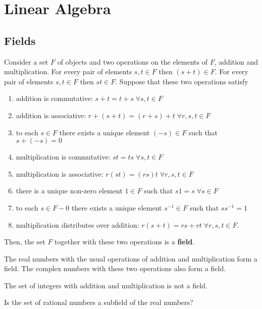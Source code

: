 \chapter{Linear Algebra}


\section{Fields}

Consider a set $F$ of objects and two operations on the elements of $F$, addition and multiplication.
For every pair of elements $s, t \in F$ then $(s + t) \in F$.
For every pair of elements $s, t \in F$ then $st \in F$.
Suppose that these two operations satisfy
\begin{enumerate}
\item addition is commutative: $s + t = t + s \; \forall s, t \in F$
\item addition is associative: $r + (s + t) = (r + s) + t \; \forall r, s, t \in F$
\item to each $s \in F$ there exists a unique element $(-s) \in F$ such that $s + (-s) = 0$
\item multiplication is commutative: $st = ts \; \forall s,t \in F$
\item multiplication is associative: $r(st) = (rs)t \; \forall r, s, t \in F$
\item there is a unique non-zero element $1 \in F$ such that $s1 = s \; \forall s \in F$
\item to each $s \in F - 0$ there exists a unique element $s^{-1} \in F$ such that $s s^{-1} = 1$
\item multiplication distributes over addition: $r (s + t) = rs + rt \; \forall r, s, t \in F$.
\end{enumerate}
Then, the set $F$ together with these two operations is a \textbf{field}.

\begin{example}
The real numbers with the usual operations of addition and multiplication form a field.
The complex numbers with these two operations also form a field.
\end{example}

\begin{example}
The set of integers with addition and multiplication is not a field.
\end{example}

\begin{problem} \label{problem:RationalNumbers}
Is the set of rational numbers a subfield of the real numbers?
\end{problem}

